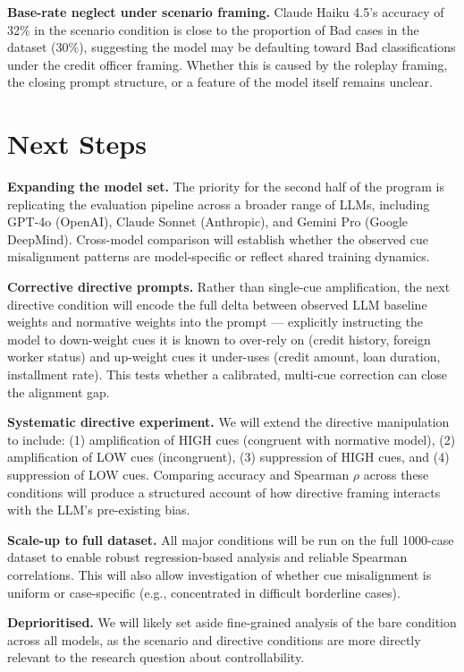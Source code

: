 \documentclass[midterm]{sparreport}
\begin{document}
\textbf{Base-rate neglect under scenario framing.} Claude Haiku 4.5's accuracy of 32\% in the scenario condition is close to the proportion of Bad cases in the dataset (30\%), suggesting the model may be defaulting toward Bad classifications under the credit officer framing. Whether this is caused by the roleplay framing, the closing prompt structure, or a feature of the model itself remains unclear.

\section{Next Steps}

\textbf{Expanding the model set.} The priority for the second half of the program is replicating the evaluation pipeline across a broader range of LLMs, including GPT-4o (OpenAI), Claude Sonnet (Anthropic), and Gemini Pro (Google DeepMind). Cross-model comparison will establish whether the observed cue misalignment patterns are model-specific or reflect shared training dynamics.

\textbf{Corrective directive prompts.} Rather than single-cue amplification, the next directive condition will encode the full delta between observed LLM baseline weights and normative weights into the prompt — explicitly instructing the model to down-weight cues it is known to over-rely on (credit history, foreign worker status) and up-weight cues it under-uses (credit amount, loan duration, installment rate). This tests whether a calibrated, multi-cue correction can close the alignment gap.

\textbf{Systematic directive experiment.} We will extend the directive manipulation to include: (1) amplification of HIGH cues (congruent with normative model), (2) amplification of LOW cues (incongruent), (3) suppression of HIGH cues, and (4) suppression of LOW cues. Comparing accuracy and Spearman $\rho$ across these conditions will produce a structured account of how directive framing interacts with the LLM's pre-existing bias.

\textbf{Scale-up to full dataset.} All major conditions will be run on the full 1000-case dataset to enable robust regression-based analysis and reliable Spearman correlations. This will also allow investigation of whether cue misalignment is uniform or case-specific (e.g., concentrated in difficult borderline cases).

\textbf{Deprioritised.} We will likely set aside fine-grained analysis of the bare condition across all models, as the scenario and directive conditions are more directly relevant to the research question about controllability.



\end{document}
